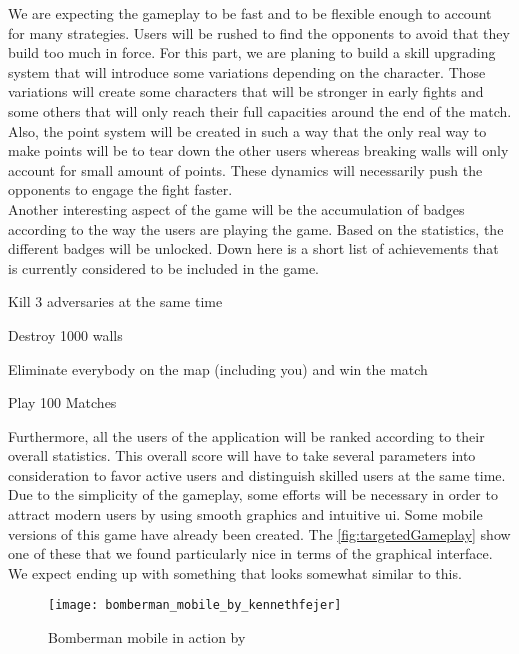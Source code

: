 We are expecting the gameplay to be fast and to be flexible enough to account for many strategies. Users will be rushed to find the opponents to avoid that they build too much in force. For this part, we are planing to build a skill upgrading system that will introduce some variations depending on the character. Those variations will create some characters that will be stronger in early fights and some others that will only reach their full capacities around the end of the match. Also, the point system will be created in such a way that the only real way to make points will be to tear down the other users whereas breaking walls will only account for small amount of points. These dynamics will necessarily push the opponents to engage the fight faster. \\

Another interesting aspect of the game will be the accumulation of badges according to the way the users are playing the game. Based on the statistics, the different badges will be unlocked. Down here is a short list of achievements that is currently considered to be included in the game.
\begin{multicols}{2}
  \begin{description}[style=nextline]
    \item [Collateral Damage] Kill 3 adversaries at the same time
    \item [Excavator] Destroy 1000 walls
    \item [Kamikaze] Eliminate everybody on the map (including you) and win the match
    \item [Veteran] Play 100 Matches
  \end{description}
\end{multicols}
Furthermore, all the users of the application will be ranked according to their overall statistics. This overall score will have to take several parameters into consideration to favor active users and distinguish skilled users at the same time. \\

Due to the simplicity of the gameplay, some efforts will be necessary in order to attract modern users by using smooth graphics and intuitive \gls{ui}. Some mobile versions of this game have already been created. The \autoref{fig:targetedGameplay} show one of these that we found particularly nice in terms of the graphical interface. We expect ending up with something that looks somewhat similar to this.

\begin{figure}[hb]
  \begin{center}
    \texttt{[image: bomberman\_mobile\_by\_kennethfejer]}
    \caption{Bomberman mobile in action by \href{Kenneth Fejer}{\cite{fejer}}}
    \label{fig:targetedGameplay}
  \end{center}
  \vspace{-\baselineskip}
\end{figure}
